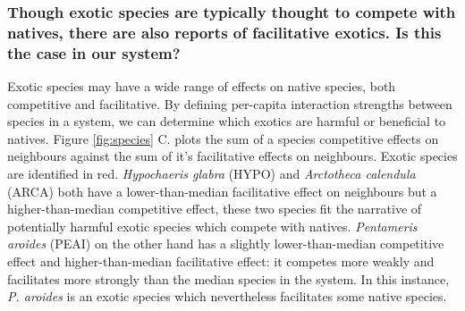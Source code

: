 \documentclass[a4,12pt]{article}
\begin{document}
    \subsubsection*{Though exotic species are typically thought to compete with natives, there are also reports of facilitative exotics. Is this the case in our system?}
    Exotic species may have a wide range of effects on native species, both competitive and facilitative. By defining per-capita interaction strengths between species in a system, we can determine which exotics are harmful or beneficial to natives. Figure \ref{fig:species} C. plots the sum of a species competitive effects on neighbours against the sum of it's facilitative effects on neighbours. Exotic species are identified in red. \textit{Hypochaeris glabra} (HYPO) and \textit{Arctotheca calendula} (ARCA) both have a lower-than-median facilitative effect on neighbours but a higher-than-median competitive effect, these two species fit the narrative of potentially harmful exotic species which compete with natives. \textit{Pentameris aroides} (PEAI) on the other hand has a slightly lower-than-median competitive effect and higher-than-median facilitative effect: it competes more weakly and facilitates more strongly than the median species in the system. In this instance, \textit{P. aroides} is an exotic species which nevertheless facilitates some native species.


\end{document}
